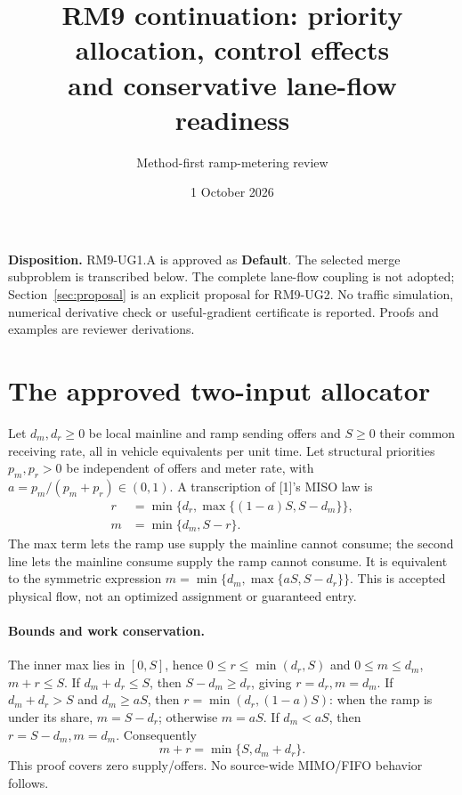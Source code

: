 \documentclass[10pt,a4paper]{article}
\title{RM9 continuation: priority allocation, control effects\\and conservative lane-flow readiness}
\author{Method-first ramp-metering review}
\date{1 October 2026}
\begin{document}
\maketitle
\noindent\textbf{Disposition.} RM9-UG1.A is approved as \textbf{Default}.
The selected merge subproblem is transcribed below. The complete lane-flow
coupling is not adopted; Section~\ref{sec:proposal} is an explicit proposal for
RM9-UG2. No traffic simulation, numerical derivative check or useful-gradient
certificate is reported. Proofs and examples are reviewer derivations.

\section{The approved two-input allocator}
Let $d_m,d_r\geq0$ be local mainline and ramp sending offers and $S\geq0$
their common receiving rate, all in vehicle equivalents per unit time.
Let structural priorities $p_m,p_r>0$ be independent of offers and meter
rate, with $a=p_m/(p_m+p_r)\in(0,1)$. A transcription of [1]'s MISO law is
\begin{align}
 r&=\min\{d_r,\max\{(1-a)S,S-d_m\}\},\label{eq:r}\\
 m&=\min\{d_m,S-r\}.\label{eq:m}
\end{align}
The max term lets the ramp use supply the mainline cannot consume; the
second line lets the mainline consume supply the ramp cannot consume.
It is equivalent to the symmetric expression
$m=\min\{d_m,\max\{aS,S-d_r\}\}$.
This is accepted physical flow, not an optimized assignment or guaranteed entry.

\paragraph{Bounds and work conservation.}
The inner max lies in $[0,S]$, hence $0\leq r\leq\min(d_r,S)$ and
$0\leq m\leq d_m$, $m+r\leq S$. If $d_m+d_r\leq S$, then
$S-d_m\geq d_r$, giving $r=d_r,m=d_m$.
If $d_m+d_r>S$ and $d_m\geq aS$, then $r=\min(d_r,(1-a)S)$:
when the ramp is under its share, $m=S-d_r$; otherwise $m=aS$.
If $d_m<aS$, then $r=S-d_m,m=d_m$. Consequently
\begin{equation}
 m+r=\min\{S,d_m+d_r\}.\label{eq:total}
\end{equation}
This proof covers zero supply/offers. No source-wide MIMO/FIFO behavior follows.
\end{document}
